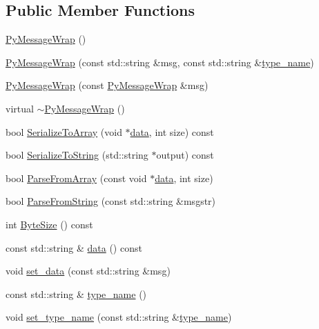 \subsection*{Public Member Functions}
\begin{DoxyCompactItemize}
\item 
\hyperlink{classapollo_1_1cyber_1_1message_1_1PyMessageWrap_afee16e2be887e76d7541d18a50597c99}{Py\-Message\-Wrap} ()
\item 
\hyperlink{classapollo_1_1cyber_1_1message_1_1PyMessageWrap_a91764a5f338c6db0a333f58423a54a8d}{Py\-Message\-Wrap} (const std\-::string \&msg, const std\-::string \&\hyperlink{classapollo_1_1cyber_1_1message_1_1PyMessageWrap_a22acd879a7d1f5f0bc631fe35a340e46}{type\-\_\-name})
\item 
\hyperlink{classapollo_1_1cyber_1_1message_1_1PyMessageWrap_aa29c3193a5a4d8ae123e5fc95ac72a00}{Py\-Message\-Wrap} (const \hyperlink{classapollo_1_1cyber_1_1message_1_1PyMessageWrap}{Py\-Message\-Wrap} \&msg)
\item 
virtual \hyperlink{classapollo_1_1cyber_1_1message_1_1PyMessageWrap_a296d5b0f8510e1dd8583269d761b3366}{$\sim$\-Py\-Message\-Wrap} ()
\item 
bool \hyperlink{classapollo_1_1cyber_1_1message_1_1PyMessageWrap_a73014cb1cfb7e55db20dff56015d05e1}{Serialize\-To\-Array} (void $\ast$\hyperlink{classapollo_1_1cyber_1_1message_1_1PyMessageWrap_a555cdbc94dc2d7dd8731c430ce2162f8}{data}, int size) const 
\item 
bool \hyperlink{classapollo_1_1cyber_1_1message_1_1PyMessageWrap_abec5b4646d56c120a9e9f4853c02e506}{Serialize\-To\-String} (std\-::string $\ast$output) const 
\item 
bool \hyperlink{classapollo_1_1cyber_1_1message_1_1PyMessageWrap_a6a7d1a5bfdaa56abcea8adb9c6c9ca61}{Parse\-From\-Array} (const void $\ast$\hyperlink{classapollo_1_1cyber_1_1message_1_1PyMessageWrap_a555cdbc94dc2d7dd8731c430ce2162f8}{data}, int size)
\item 
bool \hyperlink{classapollo_1_1cyber_1_1message_1_1PyMessageWrap_aabd1e75c765bd486ec7e1a8d3bb9c9dd}{Parse\-From\-String} (const std\-::string \&msgstr)
\item 
int \hyperlink{classapollo_1_1cyber_1_1message_1_1PyMessageWrap_a5444586ea014dea049f7323abdae7818}{Byte\-Size} () const 
\item 
const std\-::string \& \hyperlink{classapollo_1_1cyber_1_1message_1_1PyMessageWrap_a555cdbc94dc2d7dd8731c430ce2162f8}{data} () const 
\item 
void \hyperlink{classapollo_1_1cyber_1_1message_1_1PyMessageWrap_a874e045ca9bea882996e2988d99822ab}{set\-\_\-data} (const std\-::string \&msg)
\item 
const std\-::string \& \hyperlink{classapollo_1_1cyber_1_1message_1_1PyMessageWrap_a22acd879a7d1f5f0bc631fe35a340e46}{type\-\_\-name} ()
\item 
void \hyperlink{classapollo_1_1cyber_1_1message_1_1PyMessageWrap_afa88ed767a773b42fe79293f110bfd53}{set\-\_\-type\-\_\-name} (const std\-::string \&\hyperlink{classapollo_1_1cyber_1_1message_1_1PyMessageWrap_a22acd879a7d1f5f0bc631fe35a340e46}{type\-\_\-name})
\end{DoxyCompactItemize}
